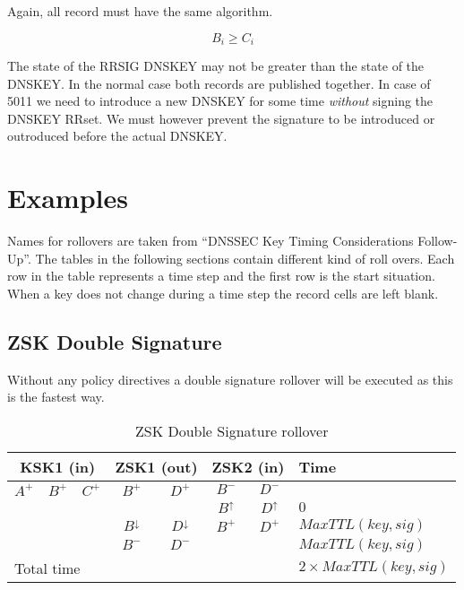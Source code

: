 \documentclass[twoside, a4paper]{article}
\begin{document}
Again, all record must have the same algorithm.

\begin{equation}
B_{i} \geq C_{i}
\end{equation}

The state of the RRSIG DNSKEY may not be greater than the state of the
DNSKEY. In the normal case both records are published together. In case
of 5011 we need to introduce a new DNSKEY for some time \emph{without}
signing the DNSKEY RRset. We must however prevent the signature to be 
introduced or outroduced before the actual DNSKEY.

\section{Examples}

Names for rollovers are taken from ``DNSSEC Key Timing 
Considerations Follow-Up''. The tables in the following sections 
contain different kind of roll overs. Each row in the table 
represents a time step and the first row is the start situation. 
When a key does not change during a time step the record cells are left 
blank.

\subsection{ZSK Double Signature}
Without any policy directives a double signature rollover will be executed
as this is the fastest way.

\begin{table}[h]
\centering
\begin{tabular}{ |ccc|cc|cc|l| }
\hline
\multicolumn{3}{|c|}{KSK1 (in)} & \multicolumn{2}{c|}{ZSK1 (out)} & \multicolumn{2}{c|}{ZSK2 (in)} & Time\\
\hline
$A^{+}$ & $B^{+}$ & $C^{+}$ & $B^{+}$          & $D^{+}$          & $B^{-}$        & $D^{-}$        & \\
        &         &         &                  &                  & $B^{\uparrow}$ & $D^{\uparrow}$ & $0$\\
        &         &         & $B^{\downarrow}$ & $D^{\downarrow}$ & $B^{+}$        & $D^{+}$        & $MaxTTL(key, sig)$\\
        &         &         & $B^{-}$          & $D^{-}$          &                &                & $MaxTTL(key, sig)$\\
\hline
\multicolumn{7}{|l|}{Total time} & $2 \times MaxTTL(key, sig)$\\
\hline
\end{tabular}
\caption{ZSK Double Signature rollover}
\label{tab:roll_dubsig}
\end{table}
\end{document}

